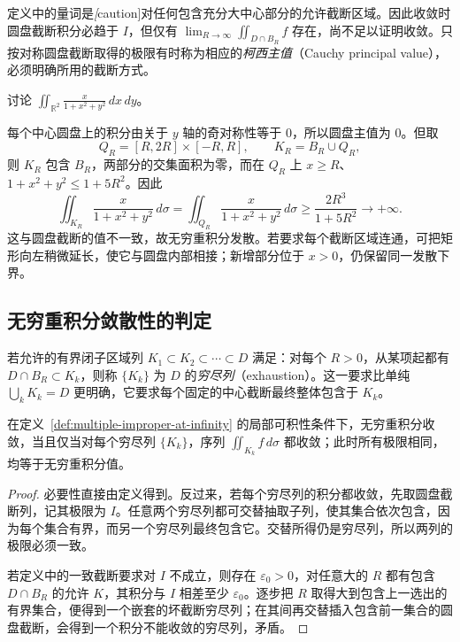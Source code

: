 \documentclass[UTF8,12pt,a4paper,fontset=fandol]{ctexbook}
\begin{document}
定义中的量词是\emph[caution]{对任何包含充分大中心部分的允许截断区域}。因此收敛时圆盘截断积分必趋于 $I$，但仅有 $\lim_{R\to\infty}\iint_{D\cap B_R}f$ 存在，尚不足以证明收敛。只按对称圆盘截断取得的极限有时称为相应的\emph{柯西主值}（Cauchy principal value），必须明确所用的截断方式。

\begin{example}
\label{ex:multiple-principal-value-not-convergence}
讨论 $\displaystyle\iint_{\mathbb R^2}\frac{x}{1+x^2+y^2}\,dx\,dy$。
\end{example}
\begin{solve}
每个中心圆盘上的积分由关于 $y$ 轴的奇对称性等于 $0$，所以圆盘主值为 $0$。但取
\[
    Q_R=[R,2R]\times[-R,R],\qquad K_R=B_R\cup Q_R,
\]
则 $K_R$ 包含 $B_R$，两部分的交集面积为零，而在 $Q_R$ 上 $x\geq R$、$1+x^2+y^2\leq1+5R^2$。因此
\[
    \iint_{K_R}\frac{x}{1+x^2+y^2}\,d\sigma
    =\iint_{Q_R}\frac{x}{1+x^2+y^2}\,d\sigma
    \geq\frac{2R^3}{1+5R^2}\to+\infty.
\]
这与圆盘截断的值不一致，故无穷重积分发散。若要求每个截断区域连通，可把矩形向左稍微延长，使它与圆盘内部相接；新增部分位于 $x>0$，仍保留同一发散下界。
\end{solve}

\subsection{无穷重积分敛散性的判定}
\label{subsec:convergence-of-infinite-multiple-integrals}

\begin{definition}
\label{def:multiple-exhaustion}
若允许的有界闭子区域列 $K_1\subset K_2\subset\cdots\subset D$ 满足：对每个 $R>0$，从某项起都有 $D\cap B_R\subset K_k$，则称 $\{K_k\}$ 为 $D$ 的\emph{穷尽列}（exhaustion）。这一要求比单纯 $\bigcup_kK_k=D$ 更明确，它要求每个固定的中心截断最终整体包含于 $K_k$。
\end{definition}

\begin{theorem}
\label{thm:multiple-improper-exhaustion}
在定义~\ref{def:multiple-improper-at-infinity} 的局部可积性条件下，无穷重积分收敛，当且仅当对每个穷尽列 $\{K_k\}$，序列 $\iint_{K_k}f\,d\sigma$ 都收敛；此时所有极限相同，均等于无穷重积分值。
\end{theorem}
\begin{proof}
必要性直接由定义得到。反过来，若每个穷尽列的积分都收敛，先取圆盘截断列，记其极限为 $I$。任意两个穷尽列都可交替抽取子列，使其集合依次包含，因为每个集合有界，而另一个穷尽列最终包含它。交替所得仍是穷尽列，所以两列的极限必须一致。

若定义中的一致截断要求对 $I$ 不成立，则存在 $\varepsilon_0>0$，对任意大的 $R$ 都有包含 $D\cap B_R$ 的允许 $K$，其积分与 $I$ 相差至少 $\varepsilon_0$。逐步把 $R$ 取得大到包含上一选出的有界集合，便得到一个嵌套的坏截断穷尽列；在其间再交替插入包含前一集合的圆盘截断，会得到一个积分不能收敛的穷尽列，矛盾。
\end{proof}
\end{document}
